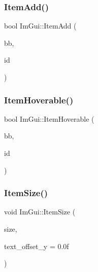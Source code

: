 \hypertarget{namespace_im_gui_a454e81b7c3befcc51c900f2fb3bd5a9a}{}\label{namespace_im_gui_a454e81b7c3befcc51c900f2fb3bd5a9a} 
\subsubsection{\texorpdfstring{Item\+Add()}{ItemAdd()}}
{\footnotesize\ttfamily bool Im\+Gui\+::\+Item\+Add (\begin{DoxyParamCaption}\item[{const \hyperlink{struct_im_rect}{Im\+Rect} \&}]{bb,  }\item[{Im\+Gui\+ID}]{id }\end{DoxyParamCaption})}

\hypertarget{namespace_im_gui_a488b86a9f235923304186fb86ff64ffb}{}\label{namespace_im_gui_a488b86a9f235923304186fb86ff64ffb} 
\subsubsection{\texorpdfstring{Item\+Hoverable()}{ItemHoverable()}}
{\footnotesize\ttfamily bool Im\+Gui\+::\+Item\+Hoverable (\begin{DoxyParamCaption}\item[{const \hyperlink{struct_im_rect}{Im\+Rect} \&}]{bb,  }\item[{Im\+Gui\+ID}]{id }\end{DoxyParamCaption})}

\hypertarget{namespace_im_gui_ac7b9a7399d9606b25278002303f545b6}{}\label{namespace_im_gui_ac7b9a7399d9606b25278002303f545b6} 
\subsubsection{\texorpdfstring{Item\+Size()}{ItemSize()}\hspace{0.1cm}{\footnotesize\ttfamily [1/2]}}
{\footnotesize\ttfamily void Im\+Gui\+::\+Item\+Size (\begin{DoxyParamCaption}\item[{const \hyperlink{struct_im_vec2}{Im\+Vec2} \&}]{size,  }\item[{float}]{text\+\_\+offset\+\_\+y = {\ttfamily 0.0f} }\end{DoxyParamCaption})}

